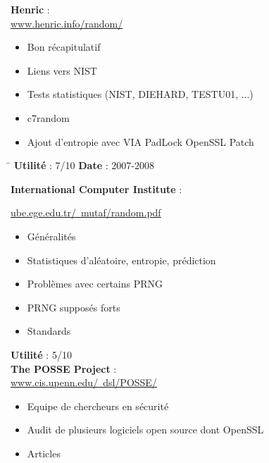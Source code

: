 \documentclass{article}
\begin{document}
	\textbf{Henric} : \\
	\href{http://www.henric.info/random/}{www.henric.info/random/} \\

	\begin{itemize}
		\item Bon récapitulatif
		\item Liens vers NIST
		\item Tests statistiques (NIST, DIEHARD, TESTU01, ...)
		\item c7random
		\item Ajout d'entropie avec VIA PadLock OpenSSL Patch
	\end{itemize}
		
	\begin{tabbing}
		\hspace{10cm}\=\kill
		\textbf{Utilité} : 7/10 \>	\textbf{Date} : 2007-2008\\
	\end{tabbing}

	\textbf{International Computer Institute} :

	\href{http://ube.ege.edu.tr/~mutaf/random.pdf}
	{ube.ege.edu.tr/~mutaf/random.pdf}\\

	\begin{itemize}
		\item Généralités
		\item Statistiques d'aléatoire, entropie, prédiction
		\item Problèmes avec certains PRNG
		\item PRNG supposés forts
		\item Standards\\
	\end{itemize}

	\textbf{Utilité} : 5/10\\

	\textbf{The POSSE Project} : \\
	\href{http://www.cis.upenn.edu/~dsl/POSSE/}
	{www.cis.upenn.edu/~dsl/POSSE/}\\

	\begin{itemize}
		\item Equipe de chercheurs en sécurité
		\item Audit de plusieurs logiciels open source dont OpenSSL
		\item Articles
	\end{itemize}
	
\end{document}
